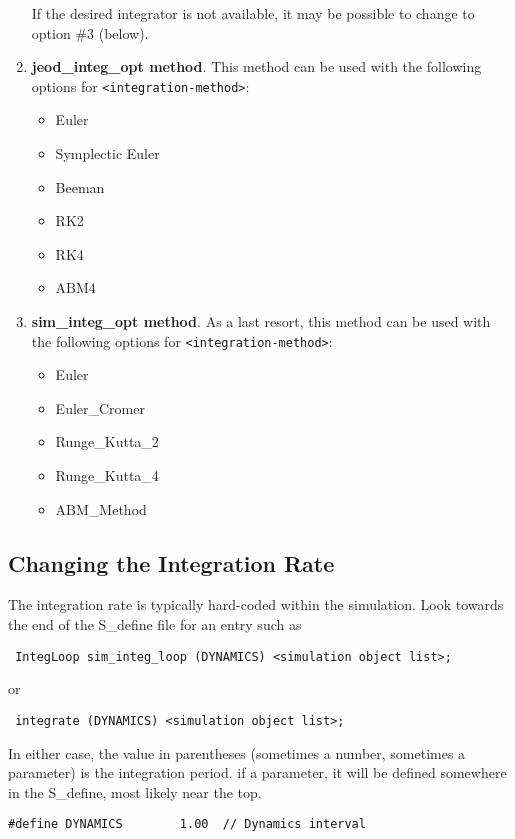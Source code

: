 \begin{enumerate}
 If the desired integrator is not available,
 it may be possible to change to option \#3 (below).

 \item \textbf{jeod\_integ\_opt method}. This method can be used with the
 following options for \newline \verb+<integration-method>+:
 \begin{itemize}
  \item Euler
  \item Symplectic Euler
  \item Beeman
  \item RK2
  \item RK4
  \item ABM4
 \end{itemize}
 \item \textbf{sim\_integ\_opt method}.  As a last resort, this method can be
 used with the following options for \verb+<integration-method>+:
 \begin{itemize}
  \item Euler
  \item Euler\_Cromer
  \item Runge\_Kutta\_2
  \item Runge\_Kutta\_4
  \item ABM\_Method
  \end{itemize}
\end{enumerate}

\subsection{Changing the Integration Rate}
The integration rate is typically hard-coded within the simulation.  Look
towards the end of the S\_define file for an entry such as
  \begin{verbatim}
 IntegLoop sim_integ_loop (DYNAMICS) <simulation object list>;
\end{verbatim}
or
\begin{verbatim}
 integrate (DYNAMICS) <simulation object list>;
\end{verbatim}

In either case, the value in parentheses (sometimes a number, sometimes a
parameter) is the integration period.  if a parameter, it will be defined
somewhere in the S\_define, most likely near the top.
\begin{verbatim}
#define DYNAMICS        1.00  // Dynamics interval
\end{verbatim}

